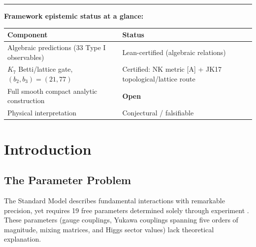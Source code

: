 \documentclass[11pt,a4paper]{article}
\begin{document}
\begin{abstract}
DUNE (2028--2040) will test the topological prediction \(\delta\)\_CP =
197\({}^{\circ}\) with resolution of a few degrees to
\textasciitilde15\({}^{\circ}\); measurement outside {[}182,
212{]}\({}^{\circ}\) would create serious tension. We present this as an
exploratory investigation emphasizing falsifiability, not a claim of
correctness.

\textbf{Keywords}: \(G_{2}\) holonomy, exceptional Lie algebras,
Standard Model parameters, topological field theory, falsifiability,
formal verification, Lean 4

\end{abstract}

\noindent\rule{\textwidth}{0.2pt}

\newpage
\tableofcontents

\bigskip
\noindent\textbf{Framework epistemic status at a glance:}

\begin{center}
\begin{tabular}{lp{9cm}}
\toprule
\textbf{Component} & \textbf{Status} \\
\midrule
Algebraic predictions (33 Type I observables) & Lean-certified (algebraic relations) \\
$K_7$ Betti/lattice gate, $(b_2, b_3) = (21, 77)$ & Certified: NK metric [A] + JK17 topological/lattice route \\
Full smooth compact analytic construction & \textbf{Open} \\
Physical interpretation & Conjectural / falsifiable \\
\bottomrule
\end{tabular}
\end{center}

\newpage

\section{Introduction}

\subsection{The Parameter Problem}

The Standard Model describes fundamental interactions with remarkable
precision, yet requires 19 free parameters determined solely through
experiment \cite{1}. These parameters (gauge couplings, Yukawa couplings
spanning five orders of magnitude, mixing matrices, and Higgs sector
values) lack theoretical explanation.
\end{document}

